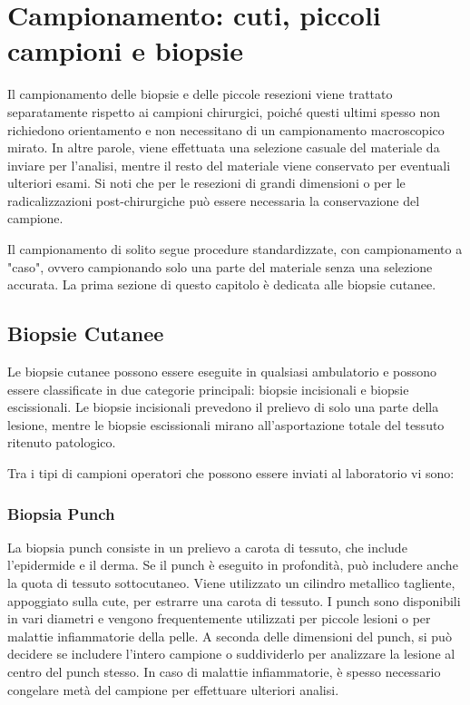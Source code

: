 \chapter{Campionamento: cuti, piccoli campioni e biopsie}

Il campionamento delle biopsie e delle piccole resezioni viene trattato separatamente rispetto ai campioni chirurgici, poiché questi ultimi spesso non richiedono orientamento e non necessitano di un campionamento macroscopico mirato. In altre parole, viene effettuata una selezione casuale del materiale da inviare per l'analisi, mentre il resto del materiale viene conservato per eventuali ulteriori esami. Si noti che per le resezioni di grandi dimensioni o per le radicalizzazioni post-chirurgiche può essere necessaria la conservazione del campione.

Il campionamento di solito segue procedure standardizzate, con campionamento a "caso", ovvero campionando solo una parte del materiale senza una selezione accurata. La prima sezione di questo capitolo è dedicata alle biopsie cutanee.

\section{Biopsie Cutanee}

Le biopsie cutanee possono essere eseguite in qualsiasi ambulatorio e possono essere classificate in due categorie principali: biopsie incisionali e biopsie escissionali. Le biopsie incisionali prevedono il prelievo di solo una parte della lesione, mentre le biopsie escissionali mirano all'asportazione totale del tessuto ritenuto patologico.

Tra i tipi di campioni operatori che possono essere inviati al laboratorio vi sono:

\subsection{Biopsia Punch}
La biopsia punch consiste in un prelievo a carota di tessuto, che include l'epidermide e il derma. Se il punch è eseguito in profondità, può includere anche la quota di tessuto sottocutaneo. Viene utilizzato un cilindro metallico tagliente, appoggiato sulla cute, per estrarre una carota di tessuto. I punch sono disponibili in vari diametri e vengono frequentemente utilizzati per piccole lesioni o per malattie infiammatorie della pelle. A seconda delle dimensioni del punch, si può decidere se includere l'intero campione o suddividerlo per analizzare la lesione al centro del punch stesso. In caso di malattie infiammatorie, è spesso necessario congelare metà del campione per effettuare ulteriori analisi.

